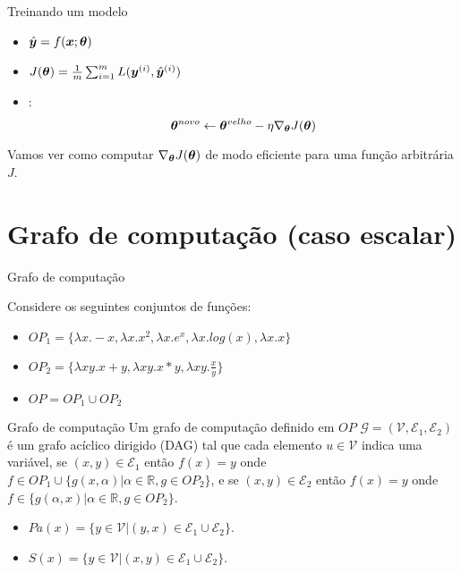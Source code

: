 \documentclass[10pt]{beamer}
\begin{document}
\begin{frame}{Treinando um modelo}
\Large{
\begin{itemize}
\item $\hat{\bm{y}} = f(\bm{x}; \bm{\theta})$ 
\item $J(\bm{\theta}) =  \frac{1}{m}\sum_{i=1}^{m} L(\bm{y}^{(i)}, {\hat{\bm{y}}}^{(i)})$ 
\item {}:
\begin{equation*}
\bm{\theta}^{novo}  \leftarrow \bm{\theta}^{velho} - \eta \nabla_{\bm{\theta}} {J(\bm{\theta})}
\end{equation*}
\vspace{0.3cm}
\end{itemize}
}

Vamos ver como computar $\nabla_{\bm{\theta}} {J(\bm{\theta})}$ de modo eficiente para uma função arbitrária $J$.

\end{frame}

\section{Grafo de computação (caso escalar)}

\begin{frame}{Grafo de computação}

Considere os seguintes  conjuntos de funções:
\Large{
\begin{itemize}
\item $OP_1 = \{ \lambda x. -x, \lambda x. x^2,  \lambda x. e^x, \lambda x. log(x), \lambda x. x \}$
\item $OP_2 = \{ \lambda xy. x + y, \lambda  xy. x * y, \lambda xy. \frac{x}{y} \}$
\item $OP = OP_1 \cup OP_2$
\end{itemize}
}
\end{frame}

\begin{frame}{Grafo de computação}
Um grafo de computação definido em $OP$ $\mathcal{G} = (\mathcal{V}, \mathcal{E}_1, \mathcal{E}_2)$ é um grafo acíclico dirigido (DAG) tal que cada elemento $u \in \mathcal{V}$ indica uma variável, se $(x,y) \in \mathcal{E}_1$ então $f(x)=y$ onde $f \in OP_1 \cup \{g(x,\alpha) | \alpha \in \mathbb{R} , g \in OP_2\}$, e se $(x,y) \in \mathcal{E}_2$ então $f(x)=y$ onde $f \in \{g(\alpha, x) | \alpha \in \mathbb{R} , g \in OP_2\}$.

\vspace{0.3cm}
\begin{itemize}
\item $Pa(x) = \{y \in \mathcal{V} | (y,x) \in \mathcal{E}_1 \cup \mathcal{E}_2 \}$.
\item $S(x) = \{y \in \mathcal{V} | (x,y) \in \mathcal{E}_1 \cup \mathcal{E}_2 \}$.
\end{itemize} 

\end{frame}
\end{document}
